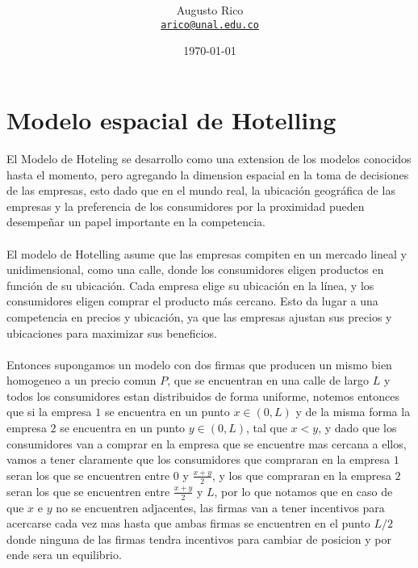 \documentclass[11pt]{article}
\title{\text{Microeconomia III - $7^a$ Monitoria}
}
\author{Augusto Rico\\%
    \href{mailto:arico@unal.edu.co}{\texttt{arico@unal.edu.co}}
    }
\date{\today}
\begin{document}
\maketitle


\section{Modelo espacial de Hotelling}
\begin{flushleft}
    El Modelo de Hoteling se desarrollo como una extension de los modelos conocidos hasta el momento, pero agregando la dimension espacial en la toma de decisiones de las empresas, esto dado que  en el mundo real, la ubicación geográfica de las empresas y la preferencia de los consumidores por la proximidad pueden desempeñar un papel importante en la competencia.\\~\\
    
    El modelo de Hotelling asume que las empresas compiten en un mercado lineal y unidimensional, como una calle, donde los consumidores eligen productos en función de su ubicación. Cada empresa elige su ubicación en la línea, y los consumidores eligen comprar el producto más cercano. Esto da lugar a una competencia en precios y ubicación, ya que las empresas ajustan sus precios y ubicaciones para maximizar sus beneficios.\\~\\

    Entonces supongamos un modelo con dos firmas que producen un mismo bien homogeneo a un precio comun $P$, que se encuentran en una calle de largo $L$ y todos los consumidores estan distribuidos de forma uniforme, notemos entonces que si la empresa $1$ se encuentra en un punto $x\in(0,L)$ y de la misma forma la empresa $2$ se encuentra en un punto $y\in(0,L)$, tal que $x<y$, y dado que los consumidores van a comprar en la empresa que se encuentre mas cercana a ellos, vamos a tener claramente que los consumidores que compraran en la empresa $1$ seran los que se encuentren entre $0$ y $\frac{x+y}{2}$, y los que compraran en la empresa $2$ seran los que se encuentren entre $\frac{x+y}{2}$ y $L$, por lo que notamos que en caso de que $x$ e $y$ no se encuentren adjacentes, las firmas van a tener incentivos para acercarse cada vez mas hasta que ambas firmas se encuentren en el punto $L/2$ donde ninguna de las firmas tendra incentivos para cambiar de posicion y por ende sera un equilibrio.\\~\\


\end{flushleft}
\end{document}
